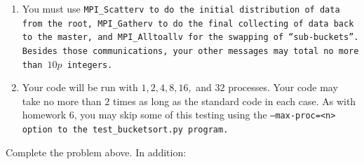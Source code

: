 \documentclass{article}
\begin{document}
\begin{enumerate}
\begin{enumerate}
\item You must use \tt{MPI\_Scatterv} to do the initial distribution
  of data from the root,  \tt{MPI\_Gatherv} to do the final collecting
  of data back to the master, and
  \tt{MPI\_Alltoallv} for the swapping of ``sub-buckets''.  Besides
  those communications, your other messages may total no more than
  $10p$ integers. 

\item Your code will be run with $1,2,4,8,16,$ and $32$ processes.
  Your code may take no more than $2$ times as long as the standard
  code in each case.  As with homework 6, you may skip some of this
  testing using the \tt{--max-proc=<n>} option to the
  \tt{test\_bucketsort.py} program. 

\end{enumerate}




\end{enumerate}

\newpage


Complete the problem above.  In addition:
\end{document}
